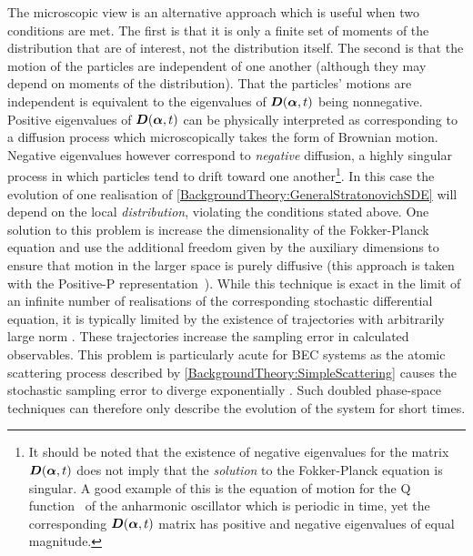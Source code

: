 The microscopic view is an alternative approach which is useful when two conditions are met. The first is that it is only a finite set of moments of the distribution that are of interest, not the distribution itself. The second is that the motion of the particles are independent of one another (although they may depend on moments of the distribution). That the particles' motions are independent is equivalent to the eigenvalues of $\bm{D}(\bm{\alpha}, t)$ being nonnegative. Positive eigenvalues of $\bm{D}(\bm{\alpha}, t)$ can be physically interpreted as corresponding to a diffusion process which microscopically takes the form of Brownian motion. Negative eigenvalues however correspond to \emph{negative} diffusion, a highly singular process in which particles tend to drift toward one another\footnote{It should be noted that the existence of negative eigenvalues for the matrix $\bm{D}(\bm{\alpha}, t)$ does not imply that the \emph{solution} to the Fokker-Planck equation is singular. A good example of this is the equation of motion for the Q function~\citep{Scully} of the anharmonic oscillator which is periodic in time, yet the corresponding $\bm{D}(\bm{\alpha}, t)$ matrix has positive and negative eigenvalues of equal magnitude.}.  In this case the evolution of one realisation of \eqref{BackgroundTheory:GeneralStratonovichSDE} will depend on the local \emph{distribution}, violating the conditions stated above.  One solution to this problem is increase the dimensionality of the Fokker-Planck equation and use the additional freedom given by the auxiliary dimensions to ensure that motion in the larger space is purely diffusive (this approach is taken with the Positive-P representation~\citep{GardinerQN}).  While this technique is exact in the limit of an infinite number of realisations of the corresponding stochastic differential equation, it is typically limited by the existence of trajectories with arbitrarily large norm \citep{Gilchrist:1997fk}.  These trajectories increase the sampling error in calculated observables.  This problem is particularly acute for BEC systems as the atomic scattering process described by \eqref{BackgroundTheory:SimpleScattering} causes the stochastic sampling error to diverge exponentially \citep{Gilchrist:1997fk}.  Such doubled phase-space techniques can therefore only describe the evolution of the system for short times.


